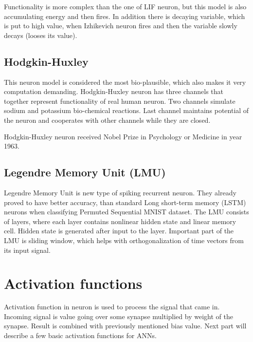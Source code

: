 Functionality is more complex than the one of LIF neuron, but this model is also accumulating energy and then fires. In addition there is decaying variable, which is put to high value, when Izhikevich neuron fires and then the variable slowly decays (looses its value).


\subsection{Hodgkin-Huxley}%
\label{sub:hodhux}

This neuron model is considered the most bio-plausible, which also makes it very computation demanding. \cite{brainmodels-hh} Hodgkin-Huxley neuron has three channels that together represent functionality of real human neuron. Two channels simulate sodium and potassium bio-chemical reactions. Last channel maintains potential of the neuron and cooperates with other channels while they are closed. \cite{hh-bio-form}

Hodgkin-Huxley neuron received Nobel Prize in Psychology or Medicine in year 1963. \cite{hh-nobel}


\subsection{Legendre Memory Unit (LMU)}%
\label{sub:lmu}

Legendre Memory Unit is new type of spiking recurrent neuron. They already proved to have better accuracy, than standard Long short-term memory (LSTM) neurons when classifying Permuted Sequential MNIST dataset. The LMU consists of layers, where each layer contains nonlinear hidden state and linear memory cell. Hidden state is generated after input to the layer. Important part of the LMU is sliding window, which helps with orthogonalization of time vectors from its input signal. \cite{lmu-article}

%
%

\section{Activation functions}%
\label{sec:activation_functions}

Activation function in neuron is used to process the signal that came in. Incoming signal is value going over some synapse multiplied by weight of the synapse. Result is combined with previously mentioned bias value. Next part will describe a few basic activation functions for ANNs.



